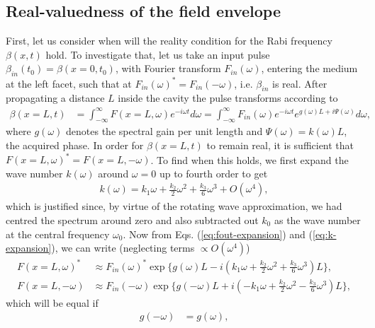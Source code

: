 \documentclass[onecolumn,secnumarabic,amssymb, nobibnotes, aip, prd]{revtex4-1}
\begin{document}
\begin{appendices}
\subsection{Real-valuedness of the field envelope}
\label{subsec:sup-real}
First, let us consider when will the reality condition for the Rabi frequency $\beta(x,t)$  hold. To investigate that, let us take an input pulse $\beta_{in}(t_0) = \beta(x=0,t_0)$, with Fourier transform $F_{in}(\omega)$, entering the medium at the left facet, such that at $F_{in}(\omega)^* = F_{in}(-\omega)$, i.e. $\beta_{in}$ is real. After propagating a distance $L$ inside the cavity the pulse transforms according to \cite{weiner2011ultrafast}
\begin{align}
\label{eq:fout-expansion}
\beta(x=L,t) &= \int_{-\infty}^{\infty} F(x=L,\omega)e^{-i\omega t}d\omega = \int_{-\infty}^{\infty} F_{in}(\omega)e^{-i\omega t}e^{g(\omega)L+i\Psi(\omega)}d\omega,
\end{align}
where $g(\omega)$ denotes the spectral gain per unit length and $\Psi(\omega)=k(\omega)L$, the acquired phase. In order for $\beta(x=L,t)$ to remain real, it is sufficient that $F(x=L,\omega)^*= F(x=L,-\omega)$. To find when this holds, we first expand the wave number $k(\omega)$ around $\omega=0$ up to fourth order to get  
\begin{align}
\label{eq:k-expansion}
k(\omega) = k_1\omega + \frac{k_2}{2}\omega^2 + \frac{k_3}{6}\omega^3 + O(\omega^4), 
\end{align}
which is justified since, by virtue of the rotating wave approximation, we had centred the spectrum around zero and also subtracted out $k_0$ as the wave number at the central frequency $\omega_0$. Now from Eqs. (\ref{eq:fout-expansion}) and (\ref{eq:k-expansion}), we can write (neglecting terms $\propto O(\omega^4)$)
\begin{subequations}
	\begin{align}
	F(x=L,\omega)^* &\approx F_{in}(\omega)^* \exp\{g(\omega)L-i(k_1\omega + \frac{k_2}{2}\omega^2 + \frac{k_3}{6}\omega^3 )L\}, \\
	F(x=L,-\omega) &\approx F_{in}(-\omega) \exp\{g(-\omega)L+i(-k_1\omega + \frac{k_2}{2}\omega^2 - \frac{k_3}{6}\omega^3 )L\},
	\end{align}
\end{subequations}
which will be equal if
\begin{subequations}
	\begin{align}
	g(-\omega) &= g(\omega), \label{eq:symmetric-gain}\\

\end{align}
\end{subequations}
\end{appendices}
\end{document}
